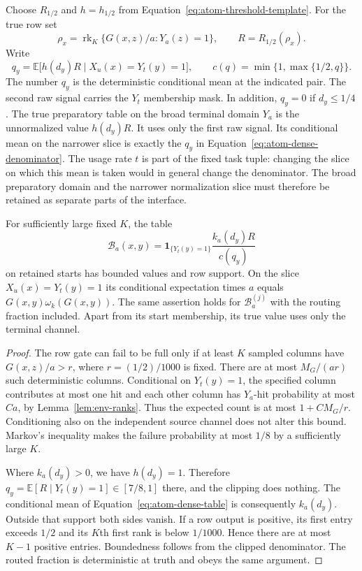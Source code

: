 Choose $R_{1/2}$ and $h=h_{1/2}$ from
Equation~\eqref{eq:atom-threshold-template}.  For the true row set
\[
 \rho_x=\operatorname{rk}_K
   \{G(x,z)/a:Y_a(z)=1\},\qquad R=R_{1/2}(\rho_x).
\]
Write
\begin{equation}
 q_y=\mathbb E\bigl[h(d_y)R\mid X_u(x)=Y_t(y)=1\bigr],
 \qquad
 c(q)=\min\{1,\max\{1/2,q\}\}.
 \label{eq:atom-dense-denominator}
\end{equation}
The number $q_y$ is the deterministic conditional mean at the indicated
pair.  The second raw signal carries the $Y_t$ membership mask.  In
addition, $q_y=0$ if $d_y\le1/4$.
The true preparatory table on the broad
terminal domain $Y_a$ is the unnormalized value $h(d_y)R$.  It uses only
the first raw signal.  Its conditional mean on the narrower slice is
exactly the $q_y$ in Equation~\eqref{eq:atom-dense-denominator}.
The usage rate $t$ is part of the fixed task tuple: changing the slice
on which this mean is taken would in general change the denominator.
The broad preparatory domain and the narrower normalization slice must
therefore be retained as separate parts of the interface.

\begin{lemma}
\label{lem:atom-dense}
For sufficiently large fixed $K$, the table
\begin{equation}
 \mathcal B_a(x,y)=
  \mathbf1_{\{Y_t(y)=1\}}\frac{k_a(d_y)R}{c(q_y)}
 \label{eq:atom-dense-table}
\end{equation}
on retained starts has bounded values and row support.  On the slice
$X_u(x)=Y_t(y)=1$ its conditional expectation times $a$ equals
$G(x,y)\omega_k(G(x,y))$.  The same assertion holds for
$\mathcal B_a^{(j)}$ with the routing fraction included.
Apart from its start membership, its true value uses only the terminal
channel.
\end{lemma}

\begin{proof}
The row gate can fail to be full only if at least $K$ sampled columns
have $G(x,z)/a>r$, where $r=(1/2)/1000$ is fixed.
There are at most $M_G/(ar)$ such deterministic columns.
Conditional on $Y_t(y)=1$, the specified column contributes at most one
hit and each other column has $Y_a$-hit probability at most $C a$, by
Lemma~\ref{lem:env-ranks}.  Thus the expected count is at most
$1+CM_G/r$.  Conditioning also on the independent source channel does
not alter this bound.  Markov's inequality makes the failure probability
at most $1/8$ by a sufficiently large $K$.

Where $k_a(d_y)>0$, we have $h(d_y)=1$.  Therefore
$q_y=\mathbb E[R\mid Y_t(y)=1]\in[7/8,1]$ there, and the clipping
does nothing.  The conditional mean of Equation~\eqref{eq:atom-dense-table}
is consequently $k_a(d_y)$.  Outside that support both sides vanish.
If a row output is positive, its first entry exceeds $1/2$ and its
$K$th first rank is below $1/1000$.  Hence there are at most $K-1$
positive entries.  Boundedness follows from the clipped denominator.  The routed
fraction is deterministic at truth and obeys the same argument.
\end{proof}

